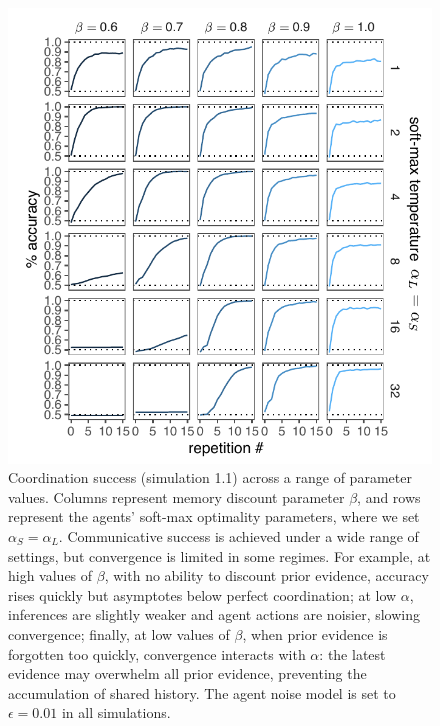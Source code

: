 \documentclass[10pt, jou, floatsintext]{apa7}
\begin{document}
 \begin{figure}
\centering
    \includegraphics[scale=1.2]{arbitrariness_grid.pdf}
  \caption{Coordination success (simulation 1.1) across a range of parameter values. Columns represent memory discount parameter $\beta$, and rows represent the agents' soft-max optimality parameters, where we set $\alpha_S=\alpha_L$. Communicative success is achieved under a wide range of settings, but convergence is limited in some regimes. For example, at high values of $\beta$, with no ability to discount prior evidence, accuracy rises quickly but asymptotes below perfect coordination; at low $\alpha$, inferences are slightly weaker and agent actions are noisier, slowing convergence; finally, at low values of $\beta$, when prior evidence is forgotten too quickly, convergence interacts with $\alpha$: the latest evidence may overwhelm all prior evidence, preventing the accumulation of shared history. The agent noise model is set to $\epsilon = 0.01$ in all simulations.}
  \label{fig:arbitrariness_grid}
\end{figure}
\end{document}
